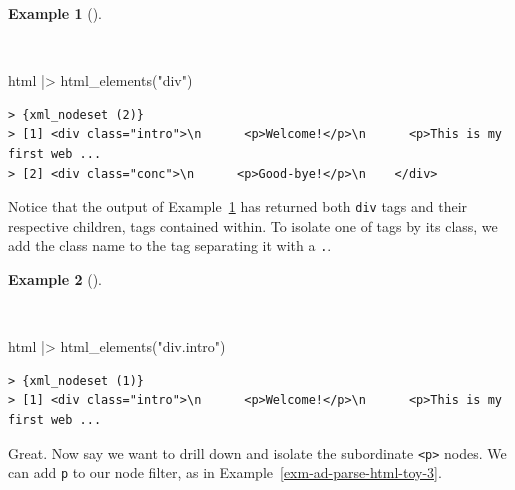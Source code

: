 \documentclass[
  letterpaper,
  DIV=11,
  numbers=noendperiod]{scrreport}
\newenvironment{Shaded}{\begin{snugshade}}{\end{snugshade}}
\newcommand{\FunctionTok}[1]{\textcolor[rgb]{0.00,0.00,0.00}{#1}}
\newcommand{\NormalTok}[1]{\textcolor[rgb]{0.00,0.00,0.00}{#1}}
\newcommand{\SpecialCharTok}[1]{\textcolor[rgb]{0.00,0.00,0.00}{#1}}
\newcommand{\StringTok}[1]{\textcolor[rgb]{0.00,0.00,0.00}{#1}}
\theoremstyle{definition}
\newtheorem{example}{Example}[chapter]
\theoremstyle{remark}
\begin{document}
\begin{example}[]\protect\hypertarget{exm-ad-parse-html-toy-1}{}\label{exm-ad-parse-html-toy-1}

~

\begin{Shaded}
\begin{Highlighting}[]
\NormalTok{html }\SpecialCharTok{|\textgreater{}}
  \FunctionTok{html\_elements}\NormalTok{(}\StringTok{"div"}\NormalTok{)}
\end{Highlighting}
\end{Shaded}

\begin{verbatim}
> {xml_nodeset (2)}
> [1] <div class="intro">\n      <p>Welcome!</p>\n      <p>This is my first web ...
> [2] <div class="conc">\n      <p>Good-bye!</p>\n    </div>
\end{verbatim}

\end{example}

Notice that the output of Example~\ref{exm-ad-parse-html-toy-1} has
returned both \texttt{div} tags and their respective children, tags
contained within. To isolate one of tags by its class, we add the class
name to the tag separating it with a \texttt{.}.

\begin{example}[]\protect\hypertarget{exm-ad-parse-html-toy-2}{}\label{exm-ad-parse-html-toy-2}

~

\begin{Shaded}
\begin{Highlighting}[]
\NormalTok{html }\SpecialCharTok{|\textgreater{}}
  \FunctionTok{html\_elements}\NormalTok{(}\StringTok{"div.intro"}\NormalTok{)}
\end{Highlighting}
\end{Shaded}

\begin{verbatim}
> {xml_nodeset (1)}
> [1] <div class="intro">\n      <p>Welcome!</p>\n      <p>This is my first web ...
\end{verbatim}

\end{example}

Great. Now say we want to drill down and isolate the subordinate
\texttt{\textless{}p\textgreater{}} nodes. We can add \texttt{p} to our
node filter, as in Example~\ref{exm-ad-parse-html-toy-3}.
\end{document}
